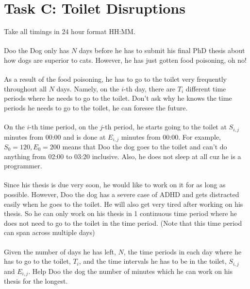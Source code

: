 \documentclass{report}
\begin{document}
\section*{Task C: Toilet Disruptions}
Take all timings in 24 hour format HH:MM.
\\\\
Doo the Dog only has $N$ days before he has to submit his final PhD thesis about how dogs are superior to cats. However, he has just gotten food poisoning, oh no!
\\\\
As a result of the food poisoning, he has to go to the toilet very frequently throughout all $N$ days. Namely, on the $i$-th day, there are $T_i$ different time periods where he needs to go to the toilet. Don't ask why he knows the time periods he needs to go to the toilet, he can foresee the future.
\\\\
On the $i$-th time period, on the $j$-th period, he starts going to the toilet at $S_{i,j}$ minutes from 00:00 and is done at $E_{i,j}$ minutes from 00:00. For example, $S_0 = 120, E_0 = 200$ means that Doo the dog goes to the toilet and can't do anything from 02:00 to 03:20 inclusive. Also, he does not sleep at all cuz he is a programmer.
\\\\
Since his thesis is due very soon, he would like to work on it for as long as possible. However, Doo the dog has a severe case of ADHD and gets distracted easily when he goes to the toilet. He will also get very tired after working on his thesis. So he can only work on his thesis in 1 continuous time period where he does not need to go to the toilet in the time period. (Note that this time period can span across multiple days)
\\\\
Given the number of days he has left, $N$, the time periods in each day where he has to go to the toilet, $T_i$, and the time intervals he has to be in the toilet, $S_{i,j}$ and $E_{i,j}$. Help Doo the dog the number of minutes which he can work on his thesis for the longest.
\end{document}
